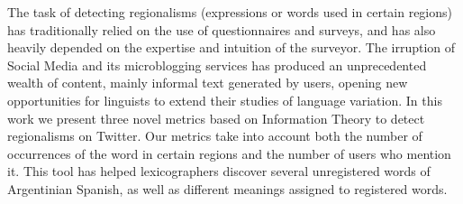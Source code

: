 The task of detecting regionalisms (expressions or words used in certain regions) has traditionally relied on the use of questionnaires and surveys, and has also heavily depended on the expertise and intuition of the surveyor.
The irruption of Social Media and its microblogging services has produced an unprecedented wealth of content, mainly informal text generated by users, opening new opportunities for linguists to extend their studies of language variation.
In this work we present three novel metrics based on Information Theory to detect regionalisms on Twitter. Our metrics take into account both the number of occurrences of the word in certain regions and the number of users who mention it. This tool has helped lexicographers discover several unregistered words of Argentinian Spanish, as well as different meanings assigned to registered words.
